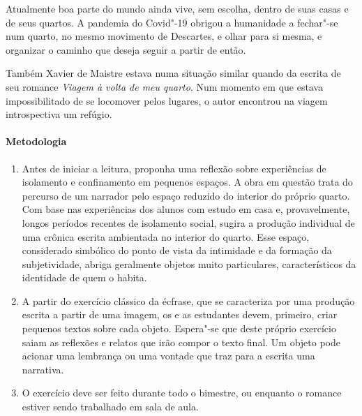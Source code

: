 \documentclass[12pt]{extarticle}
\begin{document}
Atualmente boa parte do mundo ainda vive, sem escolha, dentro de suas
casas e de seus quartos. A pandemia do Covid"-19 obrigou a humanidade
a fechar"-se num quarto, no mesmo movimento de Descartes, e olhar para  
si mesma, e organizar o caminho que deseja seguir a partir de então. 

Também Xavier de Maistre estava numa situação similar quando da 
escrita de seu romance \textit{Viagem à volta de meu quarto}. 
Num momento em que estava impossibilitado de se locomover pelos
lugares, o autor encontrou na viagem introspectiva um refúgio. 

\paragraph{Metodologia}
\begin{enumerate}
	\item
	Antes de iniciar a leitura, proponha uma reflexão sobre
experiências de isolamento e confinamento em pequenos espaços. A obra em
questão trata do percurso de um narrador pelo espaço reduzido do
interior do próprio quarto. Com base nas experiências dos alunos com
estudo em casa e, provavelmente, longos períodos recentes de isolamento
social, sugira a produção individual de uma crônica escrita
ambientada no interior do quarto. Esse espaço, considerado simbólico do
ponto de vista da intimidade e da formação da subjetividade, abriga
geralmente objetos muito particulares, característicos da identidade de
quem o habita.
	\item
	A partir do exercício clássico da écfrase, que se caracteriza por uma
	produção escrita a partir de uma imagem, os e as estudantes devem, primeiro,
	criar pequenos textos sobre cada objeto. Espera"-se que deste próprio
	exercício saiam as reflexões e relatos que irão compor o texto final.
	Um objeto pode acionar uma lembrança ou uma vontade que traz para a escrita
	uma narrativa. 


	\item 
	O exercício deve ser feito durante todo o bimestre, ou enquanto
	o romance estiver sendo trabalhado em sala de aula.

\end{enumerate}
\end{document}
